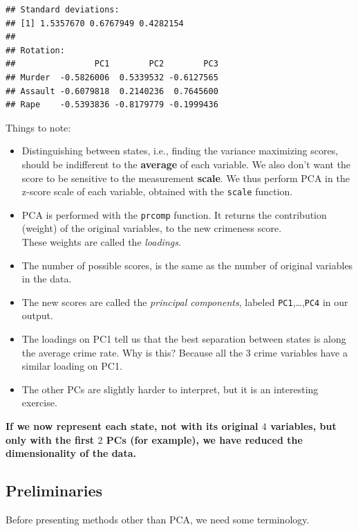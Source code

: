 \documentclass[]{book}
\providecommand{\tightlist}{%
  \setlength{\itemsep}{0pt}\setlength{\parskip}{0pt}}
\theoremstyle{definition}
\theoremstyle{definition}
\theoremstyle{remark}
\begin{document}
\begin{verbatim}
## Standard deviations:
## [1] 1.5357670 0.6767949 0.4282154
## 
## Rotation:
##                PC1        PC2        PC3
## Murder  -0.5826006  0.5339532 -0.6127565
## Assault -0.6079818  0.2140236  0.7645600
## Rape    -0.5393836 -0.8179779 -0.1999436
\end{verbatim}

Things to note:

\begin{itemize}
\tightlist
\item
  Distinguishing between states, i.e., finding the variance maximizing
  scores, should be indifferent to the \textbf{average} of each
  variable. We also don't want the score to be sensitive to the
  measurement \textbf{scale}. We thus perform PCA in the z-score scale
  of each variable, obtained with the \texttt{scale} function.
\item
  PCA is performed with the \texttt{prcomp} function. It returns the
  contribution (weight) of the original variables, to the new crimeness
  score.\\
  These weights are called the \emph{loadings}.
\item
  The number of possible scores, is the same as the number of original
  variables in the data.
\item
  The new scores are called the \emph{principal components}, labeled
  \texttt{PC1},\ldots{},\texttt{PC4} in our output.
\item
  The loadings on PC1 tell us that the best separation between states is
  along the average crime rate. Why is this? Because all the \(3\) crime
  variables have a similar loading on PC1.
\item
  The other PCs are slightly harder to interpret, but it is an
  interesting exercise.
\end{itemize}

\textbf{If we now represent each state, not with its original \(4\)
variables, but only with the first \(2\) PCs (for example), we have
reduced the dimensionality of the data.}

\subsection{Preliminaries}\label{preliminaries}

Before presenting methods other than PCA, we need some terminology.
\end{document}
